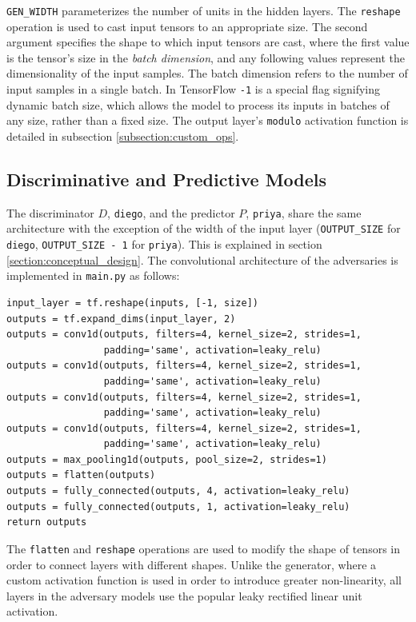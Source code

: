 \documentclass[12pt, titlepage]{report}
\theoremstyle{definition}
\begin{document}
\texttt{GEN_WIDTH} parameterizes the number of units in the hidden layers. The \texttt{reshape} operation is used to cast input tensors to an appropriate size. The second argument specifies the shape to which input tensors are cast, where the first value is the tensor's size in the \textit{batch dimension}, and any following values represent the dimensionality of the input samples. The batch dimension refers to the number of input samples in a single batch. In TensorFlow \texttt{-1} is a special flag signifying dynamic batch size, which allows the model to process its inputs in batches of any size, rather than a fixed size. The output layer's \texttt{modulo} activation function is detailed in subsection \ref{subsection:custom_ops}.


\subsection{Discriminative and Predictive Models}
The discriminator $D$, \texttt{diego}, and the predictor $P$, \texttt{priya}, share the same architecture with the exception of the width of the input layer (\texttt{OUTPUT_SIZE} for \texttt{diego}, \texttt{OUTPUT_SIZE - 1} for \texttt{priya}). This is explained in section \ref{section:conceptual_design}. The convolutional architecture of the adversaries is implemented in \texttt{main.py} as follows:

\begin{verbatim}
input_layer = tf.reshape(inputs, [-1, size])
outputs = tf.expand_dims(input_layer, 2)
outputs = conv1d(outputs, filters=4, kernel_size=2, strides=1, 
                 padding='same', activation=leaky_relu)
outputs = conv1d(outputs, filters=4, kernel_size=2, strides=1, 
                 padding='same', activation=leaky_relu)
outputs = conv1d(outputs, filters=4, kernel_size=2, strides=1, 
                 padding='same', activation=leaky_relu)
outputs = conv1d(outputs, filters=4, kernel_size=2, strides=1, 
                 padding='same', activation=leaky_relu)
outputs = max_pooling1d(outputs, pool_size=2, strides=1)
outputs = flatten(outputs)
outputs = fully_connected(outputs, 4, activation=leaky_relu)
outputs = fully_connected(outputs, 1, activation=leaky_relu)
return outputs
\end{verbatim}

The \texttt{flatten} and \texttt{reshape} operations are used to modify the shape of tensors in order to connect layers with different shapes. Unlike the generator, where a custom activation function is used in order to introduce greater non-linearity, all layers in the adversary models use the popular leaky rectified linear unit activation.
\end{document}
